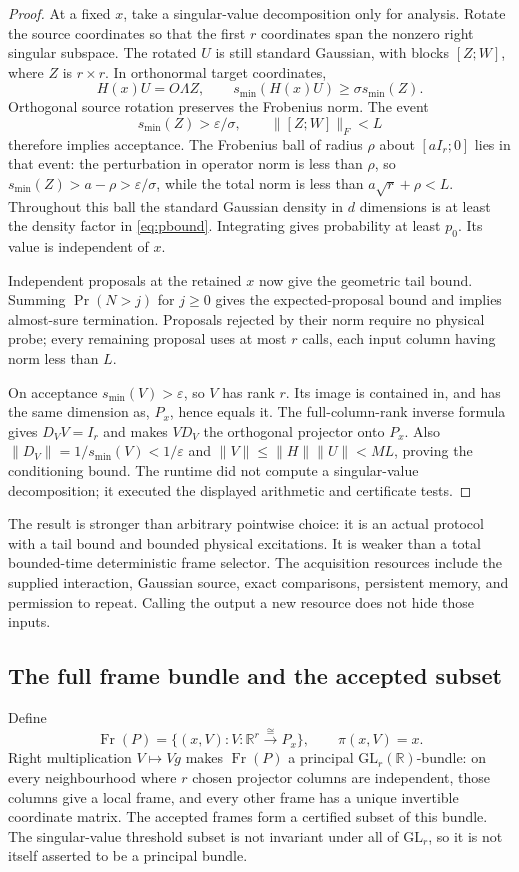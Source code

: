 \documentclass[11pt]{article}
\theoremstyle{definition}
\theoremstyle{remark}
\newcommand{\R}{\mathbb R}
\newcommand{\Fr}{\operatorname{Fr}}
\begin{document}
\begin{proof}
At a fixed $x$, take a singular-value decomposition only for analysis. Rotate the source coordinates so that the first $r$ coordinates span the nonzero right singular subspace. The rotated $U$ is still standard Gaussian, with blocks $[Z;W]$, where $Z$ is $r\times r$. In orthonormal target coordinates,
\[
                  H(x)U=O\Lambda Z,
 \qquad s_{\min}(H(x)U)\ge\sigma s_{\min}(Z).
\]
Orthogonal source rotation preserves the Frobenius norm. The event
\[
 s_{\min}(Z)>\varepsilon/\sigma,
 \qquad \|[Z;W]\|_F<L
\]
therefore implies acceptance. The Frobenius ball of radius $\rho$ about $[aI_r;0]$ lies in that event: the perturbation in operator norm is less than $\rho$, so $s_{\min}(Z)>a-\rho>\varepsilon/\sigma$, while the total norm is less than $a\sqrt r+\rho<L$. Throughout this ball the standard Gaussian density in $d$ dimensions is at least the density factor in \eqref{eq:pbound}. Integrating gives probability at least $p_0$. Its value is independent of $x$.

Independent proposals at the retained $x$ now give the geometric tail bound. Summing $\Pr(N>j)$ for $j\ge0$ gives the expected-proposal bound and implies almost-sure termination. Proposals rejected by their norm require no physical probe; every remaining proposal uses at most $r$ calls, each input column having norm less than $L$.

On acceptance $s_{\min}(V)>\varepsilon$, so $V$ has rank $r$. Its image is contained in, and has the same dimension as, $P_x$, hence equals it. The full-column-rank inverse formula gives $D_VV=I_r$ and makes $VD_V$ the orthogonal projector onto $P_x$. Also $\|D_V\|=1/s_{\min}(V)<1/\varepsilon$ and $\|V\|\le\|H\|\|U\|<ML$, proving the conditioning bound. The runtime did not compute a singular-value decomposition; it executed the displayed arithmetic and certificate tests.
\end{proof}

The result is stronger than arbitrary pointwise choice: it is an actual protocol with a tail bound and bounded physical excitations. It is weaker than a total bounded-time deterministic frame selector. The acquisition resources include the supplied interaction, Gaussian source, exact comparisons, persistent memory, and permission to repeat. Calling the output a new resource does not hide those inputs.

\subsection{The full frame bundle and the accepted subset}
Define
\[
 \Fr(P)=\{(x,V):V:\R^r\xrightarrow{\cong}P_x\},\qquad
 \pi(x,V)=x.
\]
Right multiplication $V\mapsto Vg$ makes $\Fr(P)$ a principal $\mathrm{GL}_r(\R)$-bundle: on every neighbourhood where $r$ chosen projector columns are independent, those columns give a local frame, and every other frame has a unique invertible coordinate matrix. The accepted frames form a certified subset of this bundle. The singular-value threshold subset is not invariant under all of $\mathrm{GL}_r$, so it is not itself asserted to be a principal bundle.
\end{document}
